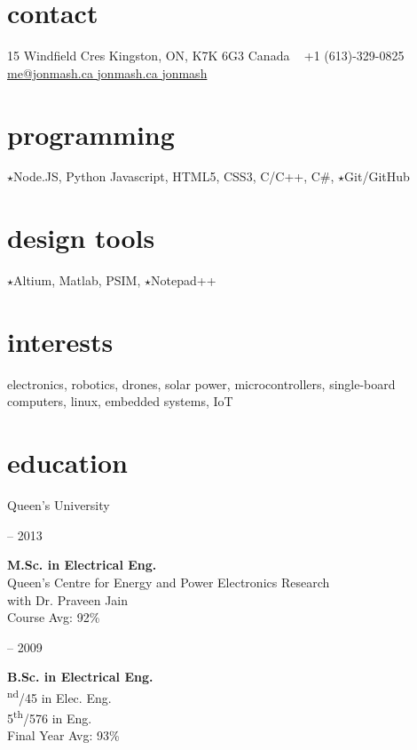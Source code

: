 
\begin{aside}
%
\section{contact}
15 Windfield Cres
Kingston, ON, K7K 6G3
Canada
~
+1 (613)-329-0825
~
\href{mailto:me@jonmash.ca}{me@jonmash.ca \faEnvelope}
\href{http://www.jonmash.ca}{jonmash.ca \faLink}
\href{https://github.com/jonmash}{jonmash \faGithub}
%
\section{programming}
{\color{orange} $\star$}Node.JS, Python
Javascript, HTML5, CSS3, C/C++, C\#,
{\color{orange} $\star$}Git/GitHub
%
\section{design tools}
{\color{orange} $\star$}Altium, Matlab, PSIM, {\color{orange} $\star$}Notepad++
%
\section{interests}
electronics, robotics, drones, solar power, microcontrollers, single-board computers, linux, embedded systems, IoT
%
\section{education}
\restorecr
{\headingfont Queen's University}
\begin{center}
{ -- 2013} \\
\end{center}
\textbf{M.Sc. {\normalfont in Electrical Eng.}}\\
{\bodyfontit Queen’s Centre for Energy and Power Electronics Research}\\
with Dr. Praveen Jain\\
Course Avg: 92\%\\
\vspace{0.3cm}
\begin{center}
{ -- 2009} \\
\end{center}
\textbf{B.Sc. {\normalfont in Electrical Eng.}}\\
{\textsuperscript{nd}/45 in Elec. Eng. \\ 5\textsuperscript{th}/576 in Eng.}\\
Final Year Avg: 93\%\\
\obeycr
\end{aside}